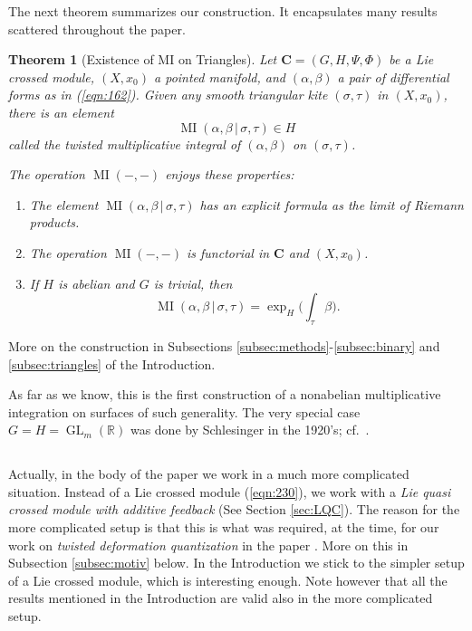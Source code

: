 \documentclass[10pt, a4paper]{amsart}
\newtheorem{thm}[equation]{Theorem}
\theoremstyle{definition}
\numberwithin{equation}{section}
\newcommand{\opn}{\operatorname}
\newcommand{\rmitem}[1]{\item[\text{\textup{(#1)}}]}
\newcommand{\mbf}[1]{\mathbf{#1}}
\newcommand{\mbb}[1]{\mathbb{#1}}
\newcommand{\tup}[1]{\textup{#1}}
\renewcommand{\vert}{\, | \,}
\newcommand{\R}{\mbb{R}}
\begin{document}
The next theorem summarizes our construction. It encapsulates many results
scattered throughout the paper.

\begin{thm}[Existence of MI on Triangles] \label{thm:18}
Let 
$\mbf{C} = (G, H, \Psi, \Phi)$
be a Lie crossed module, $(X, x_0)$ a pointed manifold, and
$(\alpha, \beta)$ a pair of differential forms as in \tup{(\ref{eqn:162})}.
Given any smooth triangular kite
$(\sigma, \tau)$ in $(X, x_0)$, there is an element
\[ \opn{MI} (\alpha, \beta \vert \sigma, \tau) \in H  \]
called the {\em twisted multiplicative integral of $(\alpha, \beta)$ on 
$(\sigma, \tau)$}.

The operation $\opn{MI}(-,-)$ enjoys these properties:
\begin{enumerate}
\rmitem{a} The element 
$\opn{MI} (\alpha, \beta \vert \sigma, \tau)$
has an explicit formula as the limit of Riemann products.
%
\rmitem{b} The operation $\opn{MI}(-,-)$ is functorial in 
$\mbf{C}$ and $(X, x_0)$.
% 
\rmitem{c} If $H$ is abelian and $G$ is trivial, then 
\[ \opn{MI} (\alpha, \beta \vert \sigma, \tau) = 
\opn{exp}_H  \bigl( \int_{\tau} \beta \bigr) . \]
\end{enumerate}
\end{thm}

More on the construction in Subsections 
\ref{subsec:methods}-\ref{subsec:binary} and \ref{subsec:triangles} of the
Introduction.

As far as we know, this is the first construction of a nonabelian
multiplicative integration on surfaces of such generality. 
The very special case $G = H = \opn{GL}_m(\R)$ was done by Schlesinger in the
1920's; cf.\ \cite{DF, KMR}. 

\subsection{} \label{subsec:actually}
Actually, in the body of the paper we work in a much more complicated situation.
Instead of a Lie crossed module (\ref{eqn:230}), we work with a {\em Lie
quasi crossed module with additive feedback} (See Section \ref{sec:LQC}). 
The reason for the more complicated setup is that this is what was 
required, at the time, for our work on {\em twisted deformation quantization}
in the paper \cite{Ye3}. More on this in Subsection \ref{subsec:motiv} below.
In the Introduction we stick to the simpler
setup of a Lie crossed module, which is interesting enough. Note
however that all the results mentioned in the Introduction are valid also in the
more complicated setup.
\end{document}
